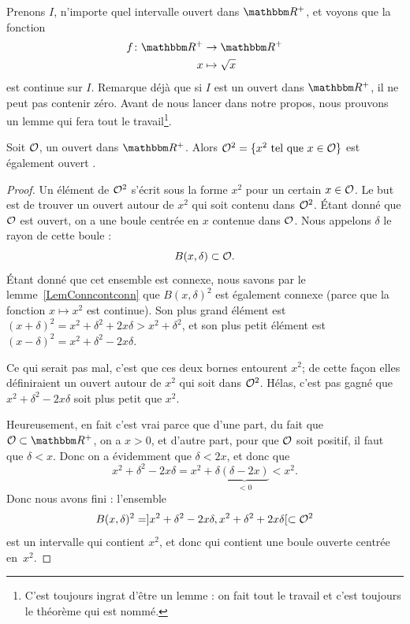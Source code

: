Prenons $I$, n'importe quel intervalle ouvert dans $\eR^+$, et voyons que la fonction
\begin{equation}
\begin{aligned}
 f\colon \eR^+&\to \eR^+ \\
   x&\mapsto \sqrt{x}
\end{aligned}
\end{equation}
est continue sur $I$. Remarque déjà que si $I$ est un ouvert dans $\eR^+$, il ne peut pas contenir zéro. Avant de nous lancer dans notre propos, nous prouvons un lemme qui fera tout le travail\footnote{C'est toujours ingrat d'être un lemme : on fait tout le travail et c'est toujours le théorème qui est nommé.}.

\begin{lemma}
Soit $\mathcal{O}$, un ouvert dans $\eR^+$. Alors $\mathcal{O}^2=\{ x^2\text{ tel que } x\in\mathcal{O} \}$ est également ouvert .
\end{lemma}

\begin{proof}
Un élément de $\mathcal{O}^2$ s'écrit sous la forme $x^2$ pour un certain $x\in\mathcal{O}$. Le but est de trouver un ouvert autour de $x^2$ qui soit contenu dans $\mathcal{O}^2$. Étant donné que $\mathcal{O}$ est ouvert, on a une boule centrée en $x$ contenue dans $\mathcal{O}$. Nous appelons $\delta$ le rayon de cette boule :
\[
  B(x,\delta)\subset\mathcal{O}.
\]
Étant donné que cet ensemble est connexe, nous savons par le lemme~\ref{LemConncontconn} que $B(x,\delta)^2$ est également connexe (parce que la fonction $x\mapsto x^2$ est continue). Son plus grand élément est $(x+\delta)^2=x^2+\delta^2+2x\delta>x^2+\delta^2$, et son plus petit élément est $(x-\delta)^2=x^2+\delta^2-2x\delta$.

Ce qui serait pas mal, c'est que ces deux bornes entourent $x^2$; de cette façon elles définiraient un ouvert autour de $x^2$ qui soit dans $\mathcal{O}^2$. Hélas, c'est pas gagné que $x^2+\delta^2-2x\delta$ soit plus petit que $x^2$.

Heureusement, en fait c'est vrai parce que d'une part, du fait que $\mO\subset\eR^+$, on a $x>0$, et d'autre part, pour que $\mathcal{O}$ soit positif, il faut que $\delta<x$. Donc on a évidemment que $\delta<2x$, et donc que
\[
  x^2+\delta^2-2x\delta=x^2+\delta\underbrace{(\delta-2x)}_{<0}<x^2.
\]
Donc nous avons fini : l'ensemble
\[
  B(x,\delta)^2=]x^2+\delta^2-2x\delta,x^2+\delta^2+2x\delta[\subset\mathcal{O}^2
\]
est un intervalle qui contient $x^2$, et donc qui contient une boule ouverte centrée en~$x^2$.

\end{proof}

